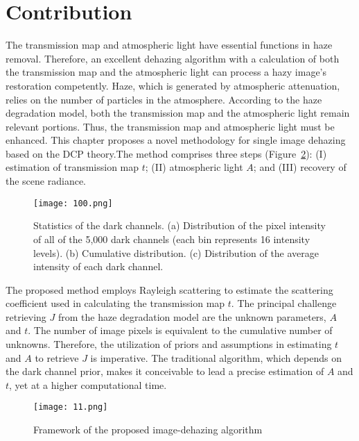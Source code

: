 \documentclass[doctor,english,listoffigures,listoftables]{thesis-uestc}
\begin{document}
\section{Contribution} \label{bc}
The transmission map and atmospheric light have essential functions in haze removal. Therefore, an excellent dehazing algorithm with a calculation of both the transmission map and the atmospheric light can process a hazy image's restoration competently. Haze, which is generated by atmospheric attenuation, relies on the number of particles in the atmosphere. According to the haze degradation model, both the transmission map and the atmospheric light remain relevant portions. Thus, the transmission map and atmospheric light must be enhanced. This chapter proposes a novel methodology for single image dehazing based on the DCP theory.The method comprises three steps (Figure~\ref{fig11}): (I) estimation of transmission map $t$; (II) atmospheric light $A$; and (III) recovery of the scene radiance.
\begin{figure}[H]
	\centering
	\texttt{[image: 100.png]}
	\caption{Statistics of the dark channels. (a) Distribution of the pixel intensity of all of the 5,000 dark channels (each bin represents 16 intensity levels). (b) Cumulative distribution. (c) Distribution of the average intensity of each dark channel.}
	\label{fig10}
\end{figure}
The proposed method employs Rayleigh scattering to estimate the scattering coefficient used in calculating the transmission map $t$. The principal challenge retrieving $J$ from the haze degradation model are the unknown parameters, $A$ and $t$. The number of image pixels is equivalent to the cumulative number of unknowns. Therefore, the utilization of priors and assumptions in estimating $t$ and $A$ to retrieve $J$ is imperative. The traditional algorithm, which depends on the dark channel prior, makes it conceivable to lead a precise estimation of $A$ and $t$, yet at a higher computational time.
\begin{figure}[H]
	\centering
	\texttt{[image: 11.png]}
	\caption{Framework of the proposed image-dehazing algorithm}
	\label{fig11}
\end{figure}
\end{document}
